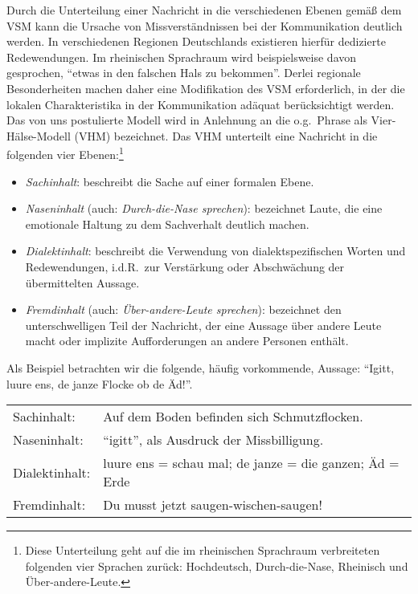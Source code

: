 \documentclass[11pt,DIV16,twocolumn]{scrartcl}
\begin{document}
Durch die Unterteilung einer Nachricht in die verschiedenen Ebenen
gemäß dem VSM kann die Ursache von Missverständnissen bei der
Kommunikation deutlich werden.  In verschiedenen Regionen Deutschlands
existieren hierfür dedizierte Redewendungen.  Im rheinischen
Sprachraum wird beispielsweise davon gesprochen, "`etwas in den
falschen Hals zu bekommen"'.  Derlei regionale Besonderheiten machen
daher eine Modifikation des VSM erforderlich, in der die lokalen
Charakteristika in der Kommunikation adäquat berücksichtigt werden.
Das von uns postulierte Modell wird in Anlehnung an die o.g.\ Phrase
als Vier-Hälse-Modell (VHM) bezeichnet.  Das VHM unterteilt eine
Nachricht in die folgenden vier Ebenen:\footnote{Diese Unterteilung
  geht auf die im rheinischen Sprachraum verbreiteten folgenden vier
  Sprachen zurück: Hochdeutsch, Durch-die-Nase, Rheinisch und
  Über-andere-Leute.}
%
\begin{itemize}
\item \textit{Sachinhalt}: beschreibt die Sache auf einer formalen
  Ebene.
\item \textit{Naseninhalt} (auch: \textit{Durch-die-Nase sprechen}):
  bezeichnet Laute, die eine emotionale Haltung zu dem Sachverhalt
  deutlich machen.
\item \textit{Dialektinhalt}: beschreibt die Verwendung von
  dialektspezifischen Worten und Redewendungen, i.d.R.\ zur
  Verstärkung oder Abschwächung der übermittelten Aussage.
\item \textit{Fremdinhalt} (auch: \textit{Über-andere-Leute
    sprechen}): bezeichnet den unterschwelligen Teil der Nachricht,
  der eine Aussage über andere Leute macht oder implizite
  Aufforderungen an andere Personen enthält.
\end{itemize}
%
Als Beispiel betrachten wir die folgende, häufig vorkommende, Aussage:
"`Igitt, luure ens, de janze Flocke ob de Äd!"'.
%
\begin{center}
  \begin{tabularx}{\linewidth}{lX}
    Sachinhalt: & Auf dem Boden befinden sich Schmutzflocken. \\
    Naseninhalt: & "`igitt"', als Ausdruck der Missbilligung. \\
    Dialektinhalt: & luure ens = schau mal; de janze = die ganzen; Äd = Erde \\
    Fremdinhalt: & Du musst jetzt saugen-wischen-saugen!
  \end{tabularx}
\end{center}
\end{document}
